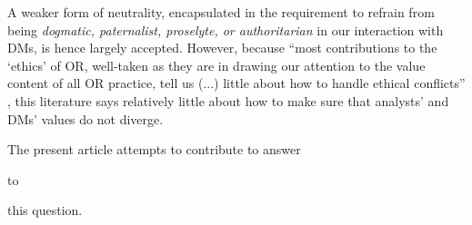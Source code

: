 \documentclass[preprint, french, english, 11pt, authoryear]{elsarticle}%
\begin{document}
\begin{changebar}
A weaker form of neutrality, encapsulated in the requirement to refrain from being \emph{dogmatic, paternalist, proselyte, or authoritarian} in our interaction with \acp{DM}, is hence largely accepted.
However, because ``most contributions to the ‘ethics’ of \ac{OR}, well-taken as they are in drawing our attention to the value content of all \ac{OR} practice, tell us (...) little about how to handle ethical conflicts'' \citep{ormerod_operational_2013},
this literature says relatively little about how to make sure that analysts' and \acp{DM}' values do not diverge.\end{changebar}
The present article attempts to contribute to answer \begin{changebar}to\end{changebar} this question.
\end{document}
